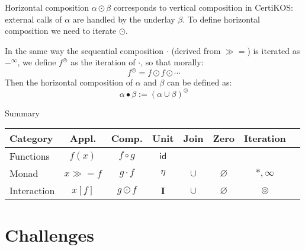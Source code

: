 \documentclass{beamer}
\newcommand{\bind}{\gg\!\!=}
\begin{document}
\begin{frame}{Horizontal composition} %
$\alpha \odot \beta$ corresponds to vertical composition in CertiKOS:
external calls of $\alpha$ are handled by the underlay $\beta$.
To define horizontal composition we need to iterate $\odot$.
\vfill

In the same way the sequential composition $\cdot$ (derived from $\bind$)
is iterated as $-^\infty$,
we define $f^\circledcirc$ as the iteration of $\cdot$,
so that morally:
\[
    f^\circledcirc = f \odot f \odot \cdots
\]
Then the horizontal composition of $\alpha$ and $\beta$
can be defined as:
\[ \alpha \bullet \beta := (\alpha \cup \beta)^\circledcirc \]
\vfill

\end{frame}

\begin{frame}{Summary} %

  \begin{center}
    \begin{tabular}{lccccccc}
      \hline
      Category & Appl. & Comp. & Unit & Join & Zero & Iteration \\
      \hline
      Functions & $f(x)$ & $f \circ g$ & $\mathsf{id}$ & & \\
      Monad &
        $x \bind f$ & $g \cdot f$ & $\eta$ &
        $\cup$ & $\varnothing$ & ${*}, {\infty}$ \\
      Interaction &
        $x[f]$ & $g \odot f$ & $\mathbf{I}$ &
        $\cup$ & $\varnothing$ & $\circledcirc$ \\
      \hline
    \end{tabular}
  \end{center}

\end{frame}

\section{Challenges}
\end{document}
